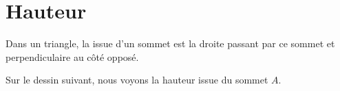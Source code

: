 \section{Hauteur}

\begin{definition}
    Dans un triangle, la  issue d'un sommet est la droite passant par ce sommet et perpendiculaire au côté opposé.
\end{definition}

Sur le dessin suivant, nous voyons la hauteur issue du sommet \( A\).

\begin{center}
   
\end{center}
